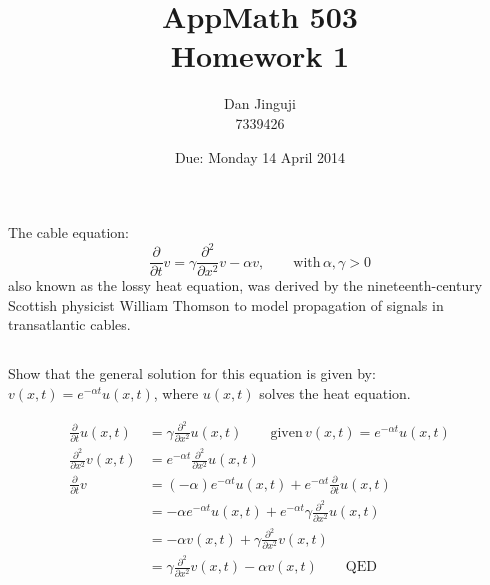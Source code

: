 \documentclass[12pt,USLetter]{article}
\begin{document}
\title{AppMath 503 \\ Homework 1}
\author{Dan Jinguji \\ 7339426}
\date{Due: Monday 14 April 2014}

\maketitle

\renewcommand\thesection {\arabic{section}:}
\renewcommand\thesubsection {(\alph{subsection})}
\newcommand{\vc}[1]{\ensuremath{\,\vec{#1}}}
\newcommand{\pbv}[2]{\ensuremath{\langle{#1}, {#2}\rangle}}
\newcommand{\he}[1]{\ensuremath{\;\hat{e}_{#1}}}
\newcommand{\er}{\he{r}}
\newcommand{\et}{\he{\theta}}
\newcommand{\pd}[1]{\ensuremath{\frac{\partial}{\partial{#1}}}}
\newcommand{\spd}[1]{\ensuremath{\frac{\partial^2}{\partial{#1}^2}}}
\newcommand{\ppd}[2]{\ensuremath{\frac{\partial{#1}}{\partial{#2}}}}
\newcommand{\abs}[1]{\ensuremath{\lvert{#1}\rvert}}
\newcommand{\pr}{\ensuremath{^{\prime}}}
\newcommand{\dpr}{\ensuremath{^{\prime\prime}}}
\newcommand{\Let}{\ensuremath{\mathrm{Let\,}}}
\newcommand{\atan}{\ensuremath{\mathrm{atan2\,}}}
\newcommand{\where}{\ensuremath{\mathrm{where\,}}}
\newcommand{\signtoinf}{\ensuremath{\Sigma_{n=1}^{\infty}}}
\newcommand{\half}{\ensuremath{\tfrac{1}{2}}}

\section{}

The cable equation:
\begin{equation*}
\pd{t}v = \gamma\spd{x}v - \alpha v, \qquad \mathrm{with\,} \alpha,\gamma > 0
\end{equation*}
also known as the lossy heat equation, was derived by the nineteenth-century Scottish physicist William Thomson to model propagation of signals in transatlantic cables.

\subsection{}

Show that the general solution for this equation is given by: $v(x,t) = e^{-\alpha t} u(x,t)$, where $u(x,t)$ solves the heat equation.

\begin{align*}
\pd{t}u(x,t) &= \gamma \spd{x}u(x,t) \qquad \mathrm{given} \,
v(x,t) = e^{-\alpha t} u(x,t) \\
\spd{x}v(x,t) &= e^{-\alpha t} \spd{x}u(x,t) \\
\pd{t}v &= (-\alpha) e^{-\alpha t} u(x,t) + e^{-\alpha t} \pd{t}u(x,t) \\
&= -\alpha e^{-\alpha t} u(x,t) + e^{-\alpha t} \gamma \spd{x}u(x,t) \\
&= -\alpha v(x,t) + \gamma \spd{x}v(x,t) \\
&= \gamma \spd{x}v(x,t) -\alpha v(x,t) \qquad \mathrm{QED}
\end{align*}
\end{document}
